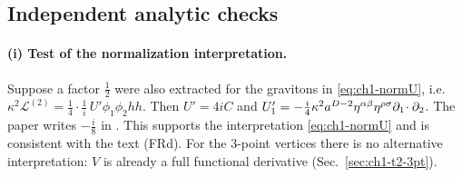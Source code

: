 \subsection{Independent analytic checks}
\label{sec:ch1-t2-checks}

\paragraph{(i) Test of the normalization interpretation.} Suppose a factor
$\tfrac12$ were also extracted for the gravitons in \eqref{eq:ch1-normU}, i.e.\
$\kappa^2\mathcal L^{(2)}=\tfrac14\cdot\tfrac1i\,U'\phi_1\phi_2hh$. Then $U'=4iC$
and
$U_1'=-\tfrac i4\kappa^2a^{D-2}\eta^{\alpha\beta}\eta^{\rho\sigma}\partial_1\!\cdot\partial_2$. The
paper writes $-\tfrac i8$ in \eqI{8}. This supports the interpretation
\eqref{eq:ch1-normU} and is consistent with the text (FRd). For the 3-point
vertices there is no alternative interpretation: $V$ is already a full
functional derivative (Sec.~\ref{sec:ch1-t2-3pt}).

